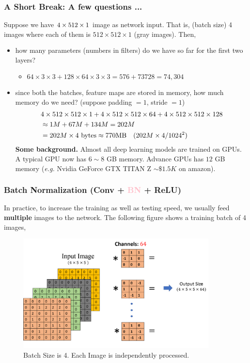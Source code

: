\documentclass[10pt]{beamer}
\newcommand{\eg}{{\it e.g.}}
\begin{document}
\begin{frame}
\frametitle{A Short Break: A few questions ...}
Suppose we have $4 \times 512 \time 512 \times 1$ image as network input. That is, (batch size) 4 images where each of them is $512 \times 512 \times 1$ (gray images). Then,
\begin{itemize}
	\item how many parameters (numbers in filters) do we have so far for the first two layers?
	\pause
	\begin{itemize}
		\item $64\times 3 \times 3 + 128\times 64 \times 3 \times 3 = 576 + 73728 = 74,304$
	\end{itemize}
	\pause
	\item since both the batches, feature maps are stored in memory, how much memory do we need? (suppose padding $= 1$, stride $ = 1$)
		\begin{align*}
		&4 \times 512 \times 512 \times 1 + 4 \times 512 \times 512 \times 64 + 4 \times 512 \times 512 \times 128 \\
		&\approx 1M + 67M + 134M = 202M \\
		&= 202 M \times 4\text{ bytes} \approx 770 \text{MB} \quad \text(202M\times4/1024^2)
		\end{align*} 
	\textbf{Some background.} Almost all deep learning models are trained on GPUs. A typical GPU now has $6 \sim 8$ GB memory. Advance GPUs has $12$ GB memory (\eg \text{ } Nvidia GeForce GTX TITAN Z $\sim \$1.5K$ on amazon). 
\end{itemize}

\end{frame}
\begin{frame}
\frametitle{Batch Normalization (Conv + \textcolor{pink}{\textbf{BN}} + ReLU)}
In practice, to increase the training as well as testing speed, we usually feed \textbf{multiple} images to the network. The following figure shows a training batch of 4 images,
	\begin{figure}[H]
		\centerline{
			\includegraphics[width=0.9\textwidth]{batch.png}
		}
		\caption{Batch Size is 4. Each Image is independently processed.}
	\end{figure}
\end{frame}
\end{document}
